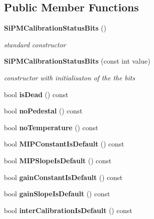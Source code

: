 \subsection*{Public Member Functions}
\begin{DoxyCompactItemize}
\item 
{\bf SiPMCalibrationStatusBits} ()
\begin{DoxyCompactList}\small\item\em standard constructor \item\end{DoxyCompactList}\item 
{\bf SiPMCalibrationStatusBits} (const int value)
\begin{DoxyCompactList}\small\item\em constructor with initialisaton of the the bits \item\end{DoxyCompactList}\item 
bool {\bfseries isDead} () const \label{classCALICE_1_1SiPMCalibrationStatusBits_a38d41dbc2d18cc248db6b3bcbdc05097}

\item 
bool {\bfseries noPedestal} () const \label{classCALICE_1_1SiPMCalibrationStatusBits_af81bc0c946d181e53c668c8d36c65c19}

\item 
bool {\bfseries noTemperature} () const \label{classCALICE_1_1SiPMCalibrationStatusBits_a5722766182d453eaf62b821ca72a6978}

\item 
bool {\bfseries MIPConstantIsDefault} () const \label{classCALICE_1_1SiPMCalibrationStatusBits_a0463a7038f71cbf0ae48b955ec7653dc}

\item 
bool {\bfseries MIPSlopeIsDefault} () const \label{classCALICE_1_1SiPMCalibrationStatusBits_a4a6738b871a263f7bfc8ef6df5168ee3}

\item 
bool {\bfseries gainConstantIsDefault} () const \label{classCALICE_1_1SiPMCalibrationStatusBits_add8c1851904732b4c45ad8889f01bc60}

\item 
bool {\bfseries gainSlopeIsDefault} () const \label{classCALICE_1_1SiPMCalibrationStatusBits_ab124476d6ad7679b2957be9ae07f5c78}

\item 
bool {\bfseries interCalibrationIsDefault} () const \label{classCALICE_1_1SiPMCalibrationStatusBits_add519a14b1b9a8fc5b4e743f6cad492b}


\end{DoxyCompactItemize}
